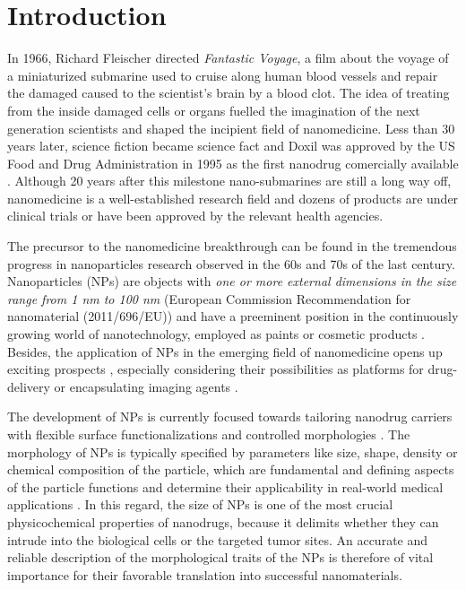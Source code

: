 \chapter{Introduction}
\label{chap:introduction}


In 1966, Richard Fleischer directed \emph{Fantastic Voyage}, a film about the voyage of a miniaturized submarine used to cruise along human blood vessels and repair the damaged caused to the scientist's brain by a blood clot. The idea of treating from the inside damaged cells or organs fuelled the imagination of the next generation scientists and shaped the incipient field of nanomedicine. Less than 30 years later, science fiction became science fact and Doxil was approved by the US Food and Drug Administration in 1995 as the first nanodrug comercially available \citep{barenholz_doxil_2012}. Although 20 years after this milestone nano-submarines are still a long way off, nanomedicine is a well-established research field and dozens of products are under clinical trials or have been approved by the relevant health agencies.

The precursor to the nanomedicine breakthrough can be found in the tremendous progress in nanoparticles research observed in the 60s and 70s of the last century. Nanoparticles (NPs) are objects with \emph{one or more external dimensions in the size range from 1 nm to 100 nm} (European Commission Recommendation for nanomaterial (2011/696/EU)) and have a preeminent position in the continuously growing world of nanotechnology, employed as paints or cosmetic products \citep{guterres_polymeric_2007}. Besides, the application of NPs in the emerging field of nanomedicine opens up exciting prospects \citep{nie_nanotechnology_2007, sahoo_nanotech_2003, wickline_nanotechnology_2003, zhou_nano-enabled_2014, rosen_rise_2005}, especially considering their possibilities as platforms for drug-delivery \citep{wang_nanoparticle_2012} or encapsulating imaging agents \citep{tao_shape-specific_2011}.

The development of NPs is currently focused towards tailoring nanodrug carriers with flexible surface functionalizations and controlled morphologies \citep{euliss_imparting_2006,yang_shape-memory_2005}. The morphology of NPs is typically specified by parameters like size, shape, density or chemical composition of the particle, which are fundamental and defining aspects of the particle functions and determine their applicability in real-world medical applications \citep{vittaz_effect_1996}. In this regard, the size of NPs is one of the most crucial physicochemical properties of nanodrugs, because it delimits whether they can intrude into the biological cells or the targeted tumor sites. An accurate and reliable description of the morphological traits of the NPs is therefore of vital importance for their favorable translation into successful nanomaterials.

